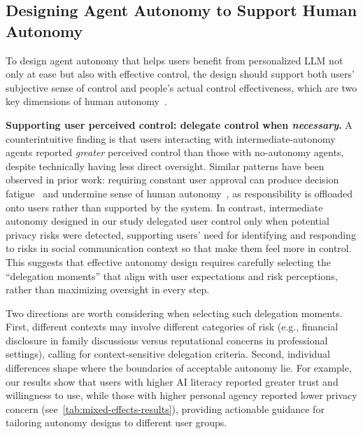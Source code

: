 \subsection{Designing Agent Autonomy to Support Human Autonomy}
\label{sec: discussion-2}

To design agent autonomy that helps users benefit from personalized LLM not only at ease but also with effective control, the design should support both users' subjective sense of control and people's actual control effectiveness, which are two key dimensions of human autonomy~\citep{bennett2023how, calvo2020supporting, prunkl2024human}.

\textbf{Supporting user perceived control: delegate control when \emph{necessary}.}
A counterintuitive finding is that users interacting with intermediate-autonomy agents reported \emph{greater} perceived control than those with no-autonomy agents, despite technically having less direct oversight.
Similar patterns have been observed in prior work: requiring constant user approval can produce decision fatigue~\citep{echterhoff2024avoiding, ahmed2025human} and undermine sense of human autonomy~\citep{steyvers2024three, zanatto2024constraining}, as responsibility is offloaded onto users rather than supported by the system.
In contrast, intermediate autonomy designed in our study delegated user control only when potential privacy risks were detected, supporting users' need for identifying and responding to risks in social communication context so that make them feel more in control.
This suggests that effective autonomy design requires carefully selecting the ``delegation moments'' that align with user expectations and risk perceptions, rather than maximizing oversight in every step.

Two directions are worth considering when selecting such delegation moments.
First, different contexts may involve different categories of risk (e.g., financial disclosure in family discussions versus reputational concerns in professional settings), calling for context-sensitive delegation criteria.
Second, individual differences shape where the boundaries of acceptable autonomy lie. For example, our results show that users with higher AI literacy reported greater trust and willingness to use, while those with higher personal agency reported lower privacy concern (see~\autoref{tab:mixed-effects-results}), providing actionable guidance for tailoring autonomy designs to different user groups.


